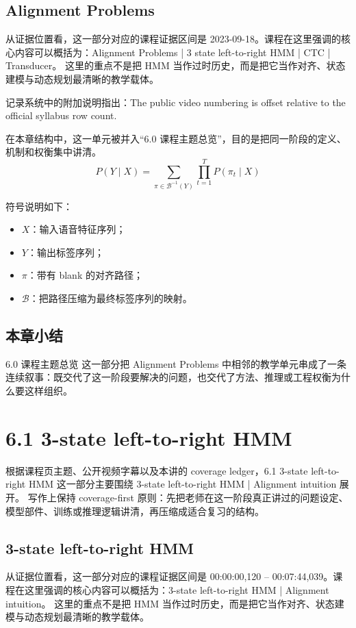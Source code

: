 \documentclass[a4paper]{article}
\begin{document}
\subsection{Alignment Problems}
从证据位置看，这一部分对应的课程证据区间是 2023-09-18。课程在这里强调的核心内容可以概括为：Alignment Problems | 3 state left-to-right HMM | CTC | Transducer。
这里的重点不是把 HMM 当作过时历史，而是把它当作对齐、状态建模与动态规划最清晰的教学载体。

记录系统中的附加说明指出：The public video numbering is offset relative to the official syllabus row count.

在本章结构中，这一单元被并入“6.0 课程主题总览”，目的是把同一阶段的定义、机制和权衡集中讲清。
\[
P(Y \mid X) = \sum_{\pi \in \mathcal{B}^{-1}(Y)} \prod_{t=1}^{T} P(\pi_t \mid X)
\]

符号说明如下：
\begin{itemize}
\item $X$：输入语音特征序列；
\item $Y$：输出标签序列；
\item $\pi$：带有 blank 的对齐路径；
\item $\mathcal{B}$：把路径压缩为最终标签序列的映射。
\end{itemize}

\subsection{本章小结}
6.0 课程主题总览 这一部分把 Alignment Problems 中相邻的教学单元串成了一条连续叙事：既交代了这一阶段要解决的问题，也交代了方法、推理或工程权衡为什么要这样组织。

\section{6.1 3-state left-to-right HMM}
根据课程页主题、公开视频字幕以及本讲的 coverage ledger，6.1 3-state left-to-right HMM 这一部分主要围绕 3-state left-to-right HMM | Alignment intuition 展开。
写作上保持 coverage-first 原则：先把老师在这一阶段真正讲过的问题设定、模型部件、训练或推理逻辑讲清，再压缩成适合复习的结构。

\subsection{3-state left-to-right HMM}
从证据位置看，这一部分对应的课程证据区间是 00:00:00,120 -- 00:07:44,039。课程在这里强调的核心内容可以概括为：3-state left-to-right HMM | Alignment intuition。
这里的重点不是把 HMM 当作过时历史，而是把它当作对齐、状态建模与动态规划最清晰的教学载体。
\end{document}
